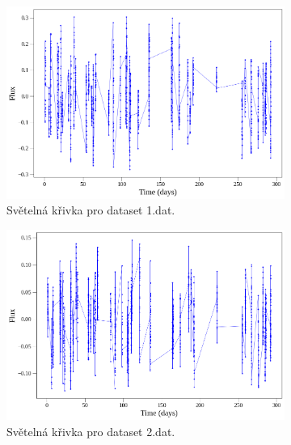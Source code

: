 \documentclass[a4paper,11pt,twocolumn]{article}
\begin{document}
            \begin{figure}%
                \centering
                \begin{subfigure}[t]{0.48\textwidth}
                    \centering
                    \includegraphics[width=\textwidth]{1_ls.png}
                    \caption{Světelná křivka pro dataset 1.dat.}
                    \label{fig:1_ls}
                \end{subfigure}
                \hfill
                \begin{subfigure}[t]{0.48\textwidth}
                    \centering
                    \includegraphics[width=\textwidth]{2_ls.png}
                    \caption{Světelná křivka pro dataset 2.dat.}
                    \label{fig:2_ls}
                \end{subfigure}
                \hfill
                \begin{subfigure}[t]{0.48\textwidth}

\end{subfigure}
\end{figure}
\end{document}
